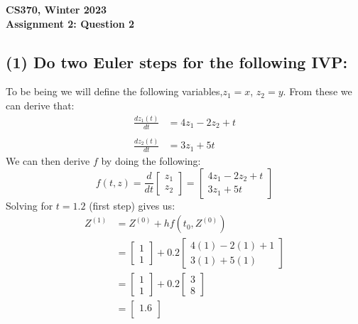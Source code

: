\documentclass[12pt]{article}
\begin{document}
\begin{center}
{\Large\textbf{CS370, Winter 2023}}\\
\vspace{2mm}
{\Large\textbf{Assignment 2: Question 2}}\\
\vspace{3mm}
\end{center}

\begin{adjustwidth}{0em}{0pt}

\section*{(1) Do two Euler steps for the following IVP:}
To be being we will define the following variables,$z_1 = x$, $z_2 = y$. From these we can derive that:
\begin{align*}
   \frac{dz_1(t)}{dt} &= 4z_1 - 2z_2 + t \\\\
   \frac{dz_2(t)}{dt} &= 3z_1 + 5t 
\end{align*}
We can then derive $f$ by doing the following:
\[ f(t,z) = \frac{d}{dt} \begin{bmatrix}
z_1\\
z_2
\end{bmatrix} =
\begin{bmatrix}
4z_1 - 2z_2 + t\\
3z_1 + 5t 
\end{bmatrix} \]
Solving for $t = 1.2$ (first step) gives us:
\begin{align*} 
	Z^{(1)} &= Z^{(0)} + hf(t_0, Z^{(0)}) \\
	        &= \begin{bmatrix}
1\\
1
\end{bmatrix} + 0.2\begin{bmatrix}
4(1) - 2(1) + 1\\
3(1) + 5(1) 
\end{bmatrix} \\
	        &= \begin{bmatrix}
1\\
1
\end{bmatrix} + 0.2\begin{bmatrix}
3\\
8 
\end{bmatrix} \\
	        &= \begin{bmatrix}
1.6\\

\end{bmatrix}
\end{align*}
\end{adjustwidth}
\end{document}
